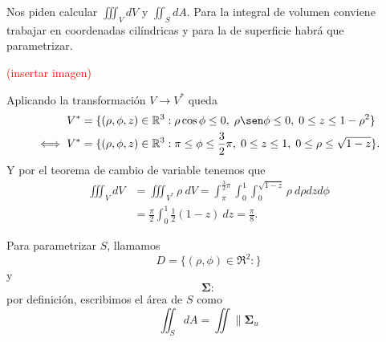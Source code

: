 \begin{solution}
    Nos piden calcular $\iiint_V dV$ y $\iint_S dA$. Para la
    integral de volumen conviene trabajar en coordenadas
    cil\'indricas y para la de superficie habr\'a que parametrizar.

    \textcolor{red}{(insertar imagen)}

    Aplicando la transformaci\'on $V \rightarrow V^*$ queda
    \begin{align*}
        V^*      & =\{(\rho, \phi, z)\in\Re^3: \rho\cos\phi \leq 0,\;
        \rho\sen\phi \leq 0,\; 0 \leq z \leq 1-\rho^2\}               \\
        \iff V^* & =\{(\rho, \phi, z)\in\Re^3: \pi \leq \phi \leq
        \frac{3}{2}\pi,\; 0 \leq z \leq 1,\; 0 \leq \rho \leq
        \sqrt{1-z} \}.                                              
    \end{align*}
    Y por el teorema de cambio de variable tenemos que
    \begin{align*}
        \iiint_V dV & = \iiint_{V^*} \rho\:dV = \int_\pi^{\frac{3}{2}\pi}
        \int_0^1\int_0^{\sqrt{1-z}}\rho\:d\rho dz d\phi                   \\
                    & =\frac{\pi}{2}\int_0^1\frac{1}{2}(1-z)\:dz =
        \frac{\pi}{8}.   
    \end{align*}

    Para parametrizar $S$, llamamos
    \[
        D = \{(\rho, \phi)\in\Re^2 :  \}  
    \] 
    y
    \[
        \boldsymbol{\Sigma}:
    \]
    por definici\'on, escribimos el \'area de $S$ como
    \[
        \iint_S dA = \iint \| \boldsymbol{\Sigma}_u  
    \]
\end{solution}


